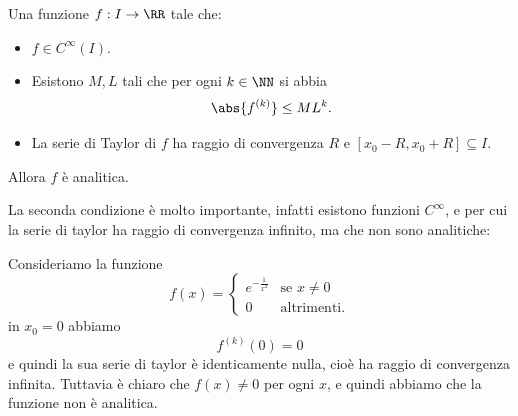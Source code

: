 \documentclass[11pt]{scrartcl}
\begin{document}
	\begin{theorem}
		Una funzione $f:I\to\RR$ tale che:
		\begin{itemize}
			\item $f\in C^\infty(I)$. 
			\item Esistono $M,L$ tali che per ogni $k\in\NN$ si abbia
			$$\abs{f^{(k)}}\le ML^k.$$
			\item La serie di Taylor di $f$ ha raggio di convergenza $R$ e $[x_0-R,x_0+R]\subseteq I$. 
		\end{itemize}
		Allora $f$ è analitica.
	\end{theorem}
	La seconda condizione è molto importante, infatti esistono funzioni $C^\infty$, e per cui la serie di taylor ha raggio di convergenza infinito, ma che non sono analitiche:
	\begin{example}
		Consideriamo la funzione
		$$f(x)=
		\begin{cases}
			e^{-\frac{1}{x^2}} & \text{se $x\ne 0$} \\
			0 & \text{altrimenti.}
		\end{cases}
		$$
		in $x_0=0$ abbiamo
		$$f^{(k)}(0)=0$$
		e quindi la sua serie di taylor è identicamente nulla, cioè ha raggio di convergenza infinita. Tuttavia è chiaro che $f(x)\ne 0$ per ogni $x$, e quindi abbiamo che la funzione non è analitica.
	\end{example}
	
	
	
	
	
	
	
\end{document}
